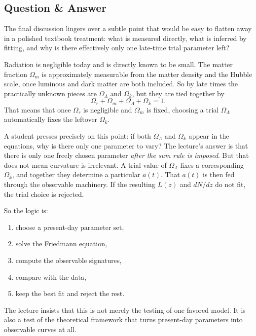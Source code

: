 \subsection{Question \& Answer}

The final discussion lingers over a subtle point that would be easy to flatten away in a polished textbook treatment: what is measured directly, what is inferred by fitting, and why is there effectively only one late-time trial parameter left?

Radiation is negligible today and is directly known to be small. The matter fraction \(\Omega_m\) is approximately measurable from the matter density and the Hubble scale, once luminous and dark matter are both included. So by late times the practically unknown pieces are \(\Omega_\Lambda\) and \(\Omega_k\), but they are tied together by
\begin{equation}
\Omega_r+\Omega_m+\Omega_\Lambda+\Omega_k=1.
\end{equation}
That means that once \(\Omega_r\) is negligible and \(\Omega_m\) is fixed, choosing a trial \(\Omega_\Lambda\) automatically fixes the leftover \(\Omega_k\).

A student presses precisely on this point: if both \(\Omega_\Lambda\) and \(\Omega_k\) appear in the equations, why is there only one parameter to vary? The lecture's answer is that there is only one freely chosen parameter \emph{after the sum rule is imposed}. But that does not mean curvature is irrelevant. A trial value of \(\Omega_\Lambda\) fixes a corresponding \(\Omega_k\), and together they determine a particular \(a(t)\). That \(a(t)\) is then fed through the observable machinery. If the resulting \(L(z)\) and \(dN/dz\) do not fit, the trial choice is rejected.

So the logic is:
\begin{enumerate}
\item choose a present-day parameter set,
\item solve the Friedmann equation,
\item compute the observable signatures,
\item compare with the data,
\item keep the best fit and reject the rest.
\end{enumerate}
The lecture insists that this is not merely the testing of one favored model. It is also a test of the theoretical framework that turns present-day parameters into observable curves at all.

